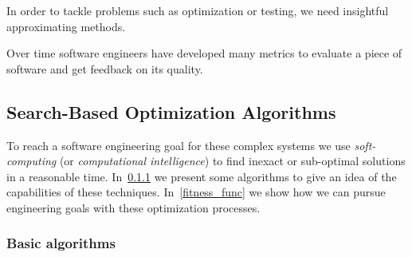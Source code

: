 \documentclass[11pt]{sdm}
\begin{document}
In order to tackle problems such as optimization or testing, we need insightful approximating methods.

Over time software engineers have developed many metrics to evaluate a piece of software and get feedback on its quality.

\subsection{Search-Based Optimization Algorithms}
\label{example_algo}

To reach a software engineering goal for these complex systems we use \textit{soft-computing} (or \textit{computational intelligence}) to find inexact or sub-optimal solutions in a reasonable time.
In~\ref{basic_algo} we present some algorithms to give an idea of the capabilities of these techniques.
In~\ref{fitness_func} we show how we can pursue engineering goals with these optimization processes.

\subsubsection{Basic algorithms}
\label{basic_algo}
\end{document}

